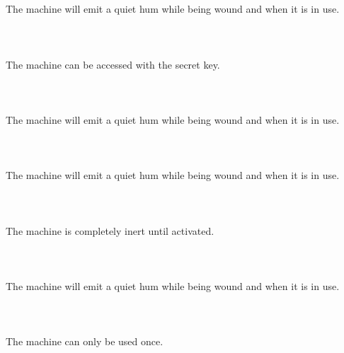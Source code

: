 \documentclass{article}
\begin{document}
    \section{}
    The machine will emit a quiet hum while being wound and when it is in use.\\\\ 
    \newpage
    
    \section{}
    The machine can be accessed with the secret key.\\\\ 
    \newpage
    
    \section{}
    The machine will emit a quiet hum while being wound and when it is in use.\\\\ 
    \newpage
    
    \section{}
    The machine will emit a quiet hum while being wound and when it is in use.\\\\ 
    \newpage
    
    \section{}
    The machine is completely inert until activated.\\\\ 
    \newpage
    
    \section{}
    The machine will emit a quiet hum while being wound and when it is in use.\\\\ 
    \newpage
    
    \section{}
    The machine can only be used once.\\\\ 
    \newpage
    
\end{document}
